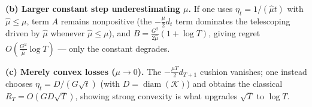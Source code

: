 \documentclass[11pt]{article}
\begin{document}
\medskip
\noindent\textbf{(b) Larger constant step underestimating $\mu$.}
If one uses $\eta_t = 1/(\hat\mu t)$ with $\hat\mu \le \mu$, term $A$ remains
nonpositive (the $-\frac{\mu}{2}d_t$ term dominates the telescoping driven by $\hat\mu$ whenever
$\hat\mu \le \mu$), and $B = \frac{G^2}{2\hat\mu}(1+\log T)$, giving regret
$O\!\left(\frac{G^2}{\hat\mu}\log T\right)$ — only the constant degrades.

\medskip
\noindent\textbf{(c) Merely convex losses ($\mu \to 0$).}
The $-\frac{\mu T}{2}d_{T+1}$ cushion vanishes; one instead chooses $\eta_t = D/(G\sqrt{t})$
(with $D=\operatorname{diam}(\mathcal{K})$) and obtains the classical $R_T = O(G D\sqrt{T})$,
showing strong convexity is what upgrades $\sqrt{T}$ to $\log T$.
\end{document}
